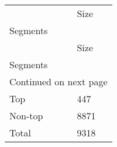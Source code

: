 \begin{longtable}[h!]{ll}
\toprule
{} &  Size \\
Segments &       \\
\midrule
\endfirsthead

\toprule
{} &  Size \\
Segments &       \\
\midrule
\endhead
\midrule
\multicolumn{2}{r}{{Continued on next page}} \\
\midrule
\endfoot

\bottomrule
\endlastfoot
Top      &   447 \\
Non-top  &  8871 \\
Total    &  9318 \\
\end{longtable}
